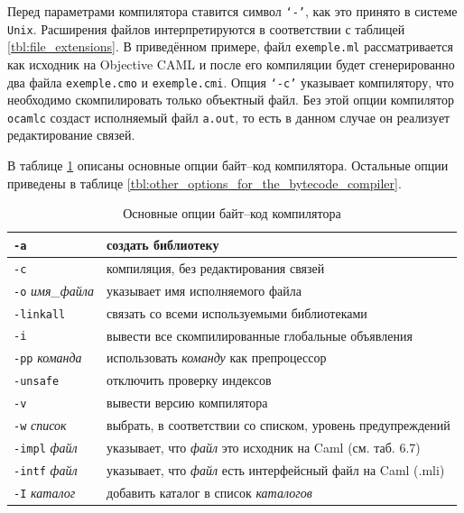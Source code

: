Перед параметрами компилятора ставится символ \texttt{`-'}, как это принято в
системе \texttt{Unix}. Расширения файлов интерпретируются в соответствии с
таблицей \ref{tbl:file_extensions}. В приведённом примере, файл
\texttt{exemple.ml} рассматривается как исходник на Objective CAML и после его
компиляции будет сгенерированно два файла \texttt{exemple.cmo} и
\texttt{exemple.cmi}. Опция \texttt{`-c'} указывает компилятору, что необходимо
скомпилировать только объектный файл. Без этой опции компилятор \texttt{ocamlc}
создаст исполняемый файл \texttt{a.out}, то есть в данном случае он реализует
редактирование связей.

В таблице \ref{tbl:principal_options_of_the_bytecode_compiler} описаны основные
опции байт--код компилятора. Остальные опции приведены в таблице
\ref{tbl:other_options_for_the_bytecode_compiler}.

\begin{table}
	\begin{tabular}{|l|l|}
	\hline
	\texttt{-a} & создать библиотеку \\
	\hline
	\texttt{-c} & компиляция, без редактирования связей \\
	\hline
	\texttt{-o} {\it имя\_файла} & указывает имя исполняемого файла \\
	\hline
	\texttt{-linkall} & связать со всеми используемыми библиотеками \\
	\hline
	\texttt{-i} & вывести все скомпилированные глобальные объявления \\
	\hline
	\texttt{-pp} {\it команда} & использовать {\it команду} как препроцессор \\
	\hline
	\texttt{-unsafe} & отключить проверку индексов \\
	\hline
	\texttt{-v} & вывести версию компилятора \\
	\hline
	\texttt{-w} {\it список} & выбрать, в соответствии со списком, уровень
предупреждений \\
	\hline
	\texttt{-impl} {\it файл} & указывает, что {\it файл} это исходник на Caml
(см. таб. 6.7) \\
	\hline
	\texttt{-intf} {\it файл} & указывает, что {\it файл} есть интерфейсный файл
на Caml (.mli) \\
	\hline
	\texttt{-I} {\it каталог} & добавить каталог в список {\it каталогов} \\
	\hline
	\end{tabular}
	\caption{\label{tbl:principal_options_of_the_bytecode_compiler}Основные
опции байт--код компилятора}
\end{table}

